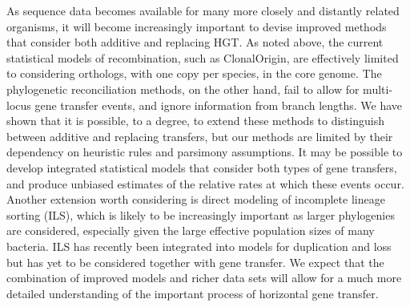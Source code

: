 \documentclass[12pt]{article}
\begin{document}
As sequence data becomes available for many more closely and distantly
related organisms, it will become increasingly important to devise improved
methods that consider both additive and replacing HGT.  As noted above, the
current statistical models of recombination, such as ClonalOrigin, are
effectively limited to considering orthologs, with one copy per species, in
the core genome.  The phylogenetic reconciliation methods, on the other
hand, fail to allow for multi-locus gene transfer events, and ignore
information from branch lengths.  We have shown that it is possible, to a
degree, to extend these methods to distinguish between additive and
replacing transfers, but our methods are limited by their dependency on
heuristic rules and parsimony assumptions.  It may be possible to develop
integrated statistical models that consider both types of gene transfers,
and produce unbiased estimates of the relative rates at which these events
occur.  Another extension worth considering is direct modeling of
incomplete lineage sorting (ILS), which is likely to be increasingly
important as larger phylogenies are considered, especially given the large
effective population sizes of many bacteria.  ILS has recently been
integrated into models for duplication and loss \citep{Rasmussen2012} but
has yet to be considered together with gene transfer.  
We expect that the combination of improved models and richer data sets
will allow for a much more detailed understanding of the important
process of horizontal gene transfer.
\end{document}
